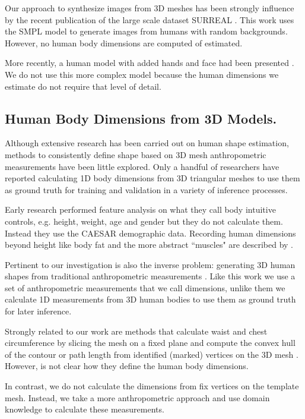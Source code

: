 \documentclass[runningheads, orivec]{llncs}
\begin{document}
Our approach to synthesize images from 3D meshes has been strongly influence by the recent publication of the large scale dataset SURREAL \cite{varol17_surreal}. This work uses the SMPL model 
to generate images 
from humans with random backgrounds. However, no human body dimensions are computed of estimated.

More recently, a human model with added hands and face had been presented \cite{Joo.2018}. We do not use this more complex model 
because the human dimensions we estimate do not require that level 
of detail.

\subsection{Human Body Dimensions from 3D Models.}
Although extensive research has been carried out on human shape estimation, 
methods to consistently define shape based on 3D mesh 
anthropometric measurements have been little explored. Only a handful of researchers 
have 
reported calculating 1D body dimensions from 3D triangular meshes to use them as ground truth for training and validation in a variety of inference processes.
 
Early research performed feature analysis on what they 
call body intuitive controls, e.g. height, weight, age and gender \cite{Allen.2003}  but they do not 
calculate them. Instead they use the CAESAR demographic data. Recording human dimensions beyond height like body fat and the more abstract ``muscles" are described by \cite{HaslerSSRS09}.

Pertinent to our investigation is also the inverse problem: generating 3D human 
shapes from traditional anthropometric measurements \cite{Wuhrer.2013}. Like this work we use a set of 
anthropometric measurements that we call dimensions, unlike them we calculate 
1D measurements from 3D human bodies to use them as ground truth for later 
inference.

Strongly related to our work are methods that calculate waist and 
chest circumference by slicing the mesh on a fixed plane and compute the convex hull of the contour \cite{Guan.2013} or path length from identified (marked) 
vertices on the 3D mesh \cite{Boisvert.2013,Dibra.2016a,Dibra.2016b}. However, is not clear how they define the human body dimensions.

In contrast, we do not 
calculate the dimensions from fix vertices on the template 
mesh. Instead, we 
take a more anthropometric approach and use domain knowledge to calculate these 
measurements.
\end{document}
